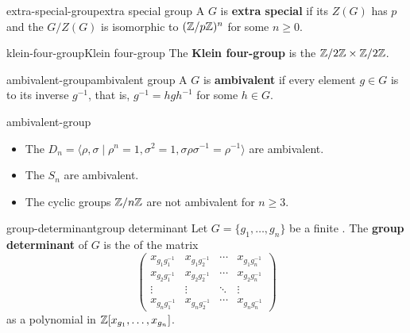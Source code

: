 \begin{topic}{extra-special-group}{extra special group}
    A  $G$ is \textbf{extra special} if its  $Z(G)$ has  $p$ and the  $G / Z(G)$ is isomorphic to $(\mathbb{Z} / p \mathbb{Z})^n$ for some $n \ge 0$.
\end{topic}

\begin{topic}{klein-four-group}{Klein four-group}
    The \textbf{Klein four-group} is the  $\mathbb{Z}/2\mathbb{Z} \times \mathbb{Z}/2\mathbb{Z}$.
\end{topic}

\begin{topic}{ambivalent-group}{ambivalent group}
    A  $G$ is \textbf{ambivalent} if every element $g \in G$ is  to its inverse $g^{-1}$, that is, $g^{-1} = hgh^{-1}$ for some $h \in G$.
\end{topic}

\begin{example}{ambivalent-group}
    \begin{itemize}
        \item The  $D_n = \langle \rho, \sigma \mid \rho^n = 1, \sigma^2 = 1, \sigma \rho \sigma^{-1} = \rho^{-1} \rangle$ are ambivalent.
        \item The  $S_n$ are ambivalent.
        \item The cyclic groups $\mathbb{Z}/n\mathbb{Z}$ are not ambivalent for $n \ge 3$.
    \end{itemize}
\end{example}

\begin{topic}{group-determinant}{group determinant}
    Let $G = \{ g_1, \ldots, g_n \}$ be a finite . The \textbf{group determinant} of $G$ is the  of the matrix
    \[ \begin{pmatrix}
        x_{g_1 g_1^{-1}} & x_{g_1 g_2^{-1}} & \cdots & x_{g_1 g_n^{-1}} \\ 
        x_{g_2 g_1^{-1}} & x_{g_2 g_2^{-1}} & \cdots & x_{g_2 g_n^{-1}} \\ 
        \vdots & \vdots & \ddots & \vdots \\
        x_{g_n g_1^{-1}} & x_{g_n g_2^{-1}} & \cdots & x_{g_n g_n^{-1}}
    \end{pmatrix} \]
    as a polynomial in $\mathbb{Z}[x_{g_1}, \ldots, x_{g_n}]$.
\end{topic}

